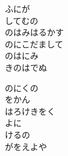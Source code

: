 \documentclass[10pt,b5j]{tarticle} %
\begin{document}
\begin{enumerate}
\begin{minipage}[c]{\blocksize}
        \vspace{\linespace}
        \item
        ふにが\\
        してむの\\
        のはみはるかす\\
        のにこだまして\\
        のはにみ\\
        きのはでぬ
        
        \vspace{\linespace}
        \item
        のにくの\\
        をかん\\
        はろけきをく\\
        よに\\
        けるの\\
        がをえよや
    
    \end{minipage}
\end{enumerate} %
\end{document}
